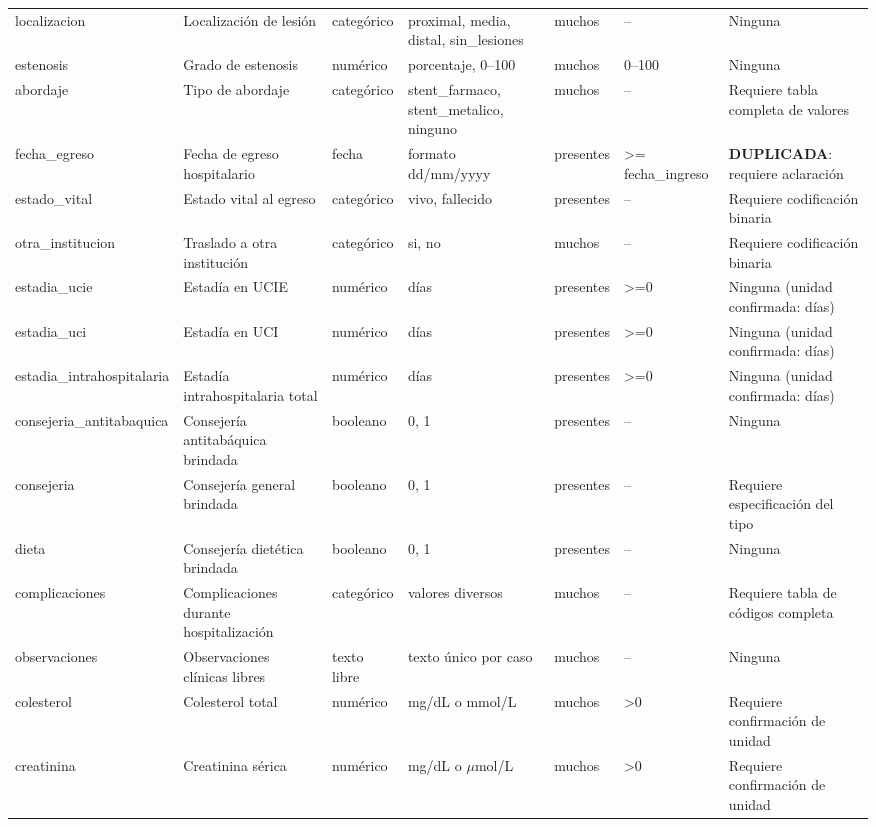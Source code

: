 \documentclass[11pt,a4paper]{article}
\begin{document}
\begin{longtable}{@{}L{0.095\textwidth} L{0.17\textwidth} L{0.07\textwidth} L{0.16\textwidth} L{0.14\textwidth} L{0.13\textwidth} L{0.15\textwidth}@{}}
localizacion & Localización de lesión & categórico & proximal, media, distal, sin\_lesiones & muchos & -- & Ninguna \\
estenosis & Grado de estenosis & numérico & porcentaje, 0--100 & muchos & 0--100 & Ninguna \\
abordaje & Tipo de abordaje & categórico & stent\_farmaco, stent\_metalico, ninguno & muchos & -- & Requiere tabla completa de valores \\
fecha\_egreso & Fecha de egreso hospitalario & fecha & formato dd/mm/yyyy & presentes & >= fecha\_ingreso & \textbf{DUPLICADA}: requiere aclaración \\
estado\_vital & Estado vital al egreso & categórico & vivo, fallecido & presentes & -- & Requiere codificación binaria \\
otra\_institucion & Traslado a otra institución & categórico & si, no & muchos & -- & Requiere codificación binaria \\
estadia\_ucie & Estadía en UCIE & numérico & días & presentes & >=0 & Ninguna (unidad confirmada: días) \\
estadia\_uci & Estadía en UCI & numérico & días & presentes & >=0 & Ninguna (unidad confirmada: días) \\
estadia\_intrahospitalaria & Estadía intrahospitalaria total & numérico & días & presentes & >=0 & Ninguna (unidad confirmada: días) \\
consejeria\_antitabaquica & Consejería antitabáquica brindada & booleano & 0, 1 & presentes & -- & Ninguna \\
consejeria & Consejería general brindada & booleano & 0, 1 & presentes & -- & Requiere especificación del tipo \\
dieta & Consejería dietética brindada & booleano & 0, 1 & presentes & -- & Ninguna \\
complicaciones & Complicaciones durante hospitalización & categórico & valores diversos & muchos & -- & Requiere tabla de códigos completa \\
observaciones & Observaciones clínicas libres & texto libre & texto único por caso & muchos & -- & Ninguna \\
colesterol & Colesterol total & numérico & mg/dL o mmol/L & muchos & >0 & Requiere confirmación de unidad \\
creatinina & Creatinina sérica & numérico & mg/dL o $\mu$mol/L & muchos & >0 & Requiere confirmación de unidad \\

\end{longtable}
\end{document}

